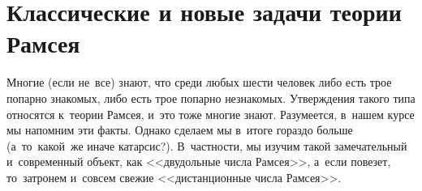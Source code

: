 
\section*{Классические и новые задачи теории Рамсея}



Многие (если не~все) знают, что среди любых шести человек либо есть трое
попарно знакомых, либо есть трое попарно незнакомых.
Утверждения такого типа относятся к~теории Рамсея, и~это тоже многие знают.
Разумеется, в~нашем курсе мы напомним эти факты.
Однако сделаем мы в~итоге гораздо больше (а~то~какой~же иначе катарсис?).
В~частности, мы изучим такой замечательный и~современный объект, как
<<двудольные числа Рамсея>>, а~если повезет, то~затронем и~совсем свежие
<<дистанционные числа Рамсея>>.

